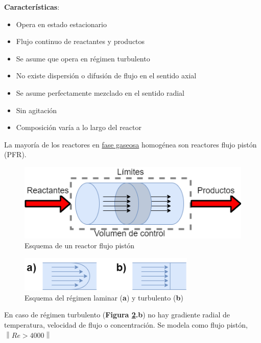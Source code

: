     \textbf{Características}:
    
    \begin{itemize}
        \item Opera en estado estacionario
        \item Flujo continuo de reactantes y productos
        \item Se asume que opera en régimen turbulento
        \item No existe dispersión o difusión de flujo en el sentido axial
        \item Se asume perfectamente mezclado en el sentido radial
        \item Sin agitación
        \item Composición varía a lo largo del reactor
    \end{itemize}
    
    La mayoría de los reactores en \underline{fase gaseosa} homogénea son reactores flujo pistón (PFR).
    
    \begin{figure}
        \centering
        \includegraphics[width=.6\textwidth]{img/diagramas/esquema_reactor_flujo_piston.png}
        \caption{Esquema de un reactor flujo pistón}
        \label{fig:esquema_reactor_flujo_piston}
    \end{figure}
    
    \begin{figure}
        \centering
        \includegraphics[width=0.75\textwidth]{img/diagramas/regimen_de_movimiento.png}
        \caption[Esquema de Régimen Laminar y Turbulento)]{Esquema del régimen laminar (\textbf{a}) y turbulento (\textbf{b})}
        \label{fig:regimen_movimiento}
    \end{figure}
    
    En caso de régimen turbulento (\textbf{Figura \ref{fig:regimen_movimiento}.b}) no hay gradiente radial de temperatura, velocidad de flujo o concentración. Se modela como flujo pistón, \(\left \| Re > 4000 \right \| \)
    
